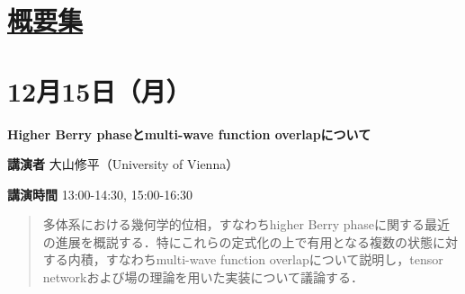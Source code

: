 \documentclass{ltjsarticle}
\theoremstyle{mystyle} %
\numberwithin{equation}{section}
\newcommand{\spkA}{大山修平}
\newcommand{\instA}{University of Vienna}
\newcommand{\titleA}{Higher Berry phaseとmulti-wave function overlapについて}
\newcommand{\abst}[5]{
    \Large
    \textbf{#1}
    \normalsize
    
    \vspace{10pt}

    \textbf{講演者} #2（#3）

    \textbf{講演時間} #4

    \vspace{5pt}

    \begin{quote}
        #5
    \end{quote}

    \vspace{10pt}
}
\begin{document}

\section*{\underline{概要集}}

\section*{12月15日（月）}

\abst{\titleA}{\spkA}{\instA}{13:00-14:30, 15:00-16:30}{
    多体系における幾何学的位相，すなわちhigher Berry phaseに関する最近の進展を概説する．特にこれらの定式化の上で有用となる複数の状態に対する内積，すなわちmulti-wave function overlapについて説明し，tensor networkおよび場の理論を用いた実装について議論する．
}

    


\end{document}
